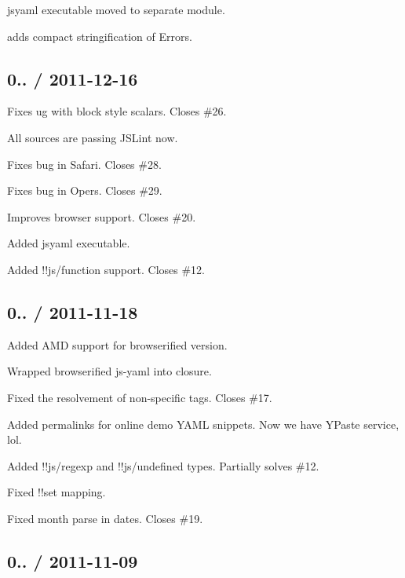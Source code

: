 \begin{DoxyItemize}
\item jsyaml executable moved to separate module.
\item adds {\ttfamily compact} stringification of Errors.
\end{DoxyItemize}

\subsection*{0.. / 2011-\/12-\/16 }


\begin{DoxyItemize}
\item Fixes ug with block style scalars. Closes \#26.
\item All sources are passing J\+S\+Lint now.
\item Fixes bug in Safari. Closes \#28.
\item Fixes bug in Opers. Closes \#29.
\item Improves browser support. Closes \#20.
\item Added jsyaml executable.
\item Added !!js/function support. Closes \#12.
\end{DoxyItemize}

\subsection*{0.. / 2011-\/11-\/18 }


\begin{DoxyItemize}
\item Added A\+M\+D support for browserified version.
\item Wrapped browserified js-\/yaml into closure.
\item Fixed the resolvement of non-\/specific tags. Closes \#17.
\item Added permalinks for online demo Y\+A\+M\+L snippets. Now we have Y\+Paste service, lol.
\item Added !!js/regexp and !!js/undefined types. Partially solves \#12.
\item Fixed !!set mapping.
\item Fixed month parse in dates. Closes \#19.
\end{DoxyItemize}

\subsection*{0.. / 2011-\/11-\/09 }


